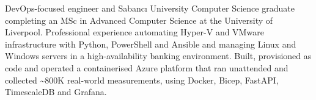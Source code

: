 



DevOps-focused engineer and Sabancı University Computer Science graduate completing an MSc in Advanced Computer Science at the University of Liverpool. Professional experience automating Hyper-V and VMware infrastructure with Python, PowerShell and Ansible and managing Linux and Windows servers in a high-availability banking environment. Built, provisioned as code and operated a containerised Azure platform that ran unattended and collected \textasciitilde 800K real-world measurements, using Docker, Bicep, FastAPI, TimescaleDB and Grafana.




